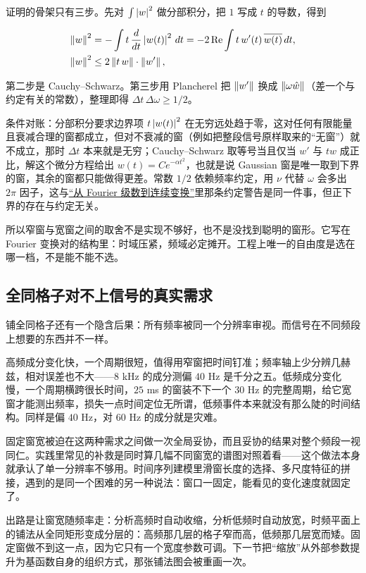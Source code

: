 证明的骨架只有三步。先对 \(\int\left|w\right|^2\) 做分部积分，把 \(1\) 写成 \(t\) 的导数，得到

\[
\begin{aligned}
\left\lVert w\right\rVert^2&=-\int t\,\frac{d}{dt}\left|w(t)\right|^2\,dt=-2\operatorname{Re}\int t\,w'(t)\,\overline{w(t)}\,dt,\\
\left\lVert w\right\rVert^2&\le 2\left\lVert t\,w\right\rVert\cdot\left\lVert w'\right\rVert,
\end{aligned}
\]

第二步是 Cauchy--Schwarz。第三步用 Plancherel 把 \(\left\lVert w'\right\rVert\) 换成 \(\left\lVert\omega\hat w\right\rVert\)（差一个与约定有关的常数），整理即得 \(\Delta t\,\Delta\omega\ge1/2\)。

条件对账：分部积分要求边界项 \(t\left|w(t)\right|^2\) 在无穷远处趋于零，这对任何有限能量且衰减合理的窗都成立，但对不衰减的窗（例如把整段信号原样取来的``无窗''）就不成立，那时 \(\Delta t\) 本来就是无穷；Cauchy--Schwarz 取等号当且仅当 \(w'\) 与 \(t w\) 成正比，解这个微分方程给出 \(w(t)=Ce^{-\alpha t^2}\)，也就是说 Gaussian 窗是唯一取到下界的窗，其余的窗都只能做得更差。常数 \(1/2\) 依赖频率约定，用 \(\nu\) 代替 \(\omega\) 会多出 \(2\pi\) 因子，这与\hyperref[sec:08-Numerical-Analysis/08-Fourier-and-Spectral-Methods/01]{``从 Fourier 级数到连续变换''}里那条约定警告是同一件事，但正下界的存在与约定无关。

所以窄窗与宽窗之间的取舍不是实现不够好，也不是没找到聪明的窗形。它写在 Fourier 变换对的结构里：时域压紧，频域必定摊开。工程上唯一的自由度是选在哪一档，不是能不能不选。

\subsection{全同格子对不上信号的真实需求}

铺全同格子还有一个隐含后果：所有频率被同一个分辨率审视。而信号在不同频段上想要的东西并不一样。

高频成分变化快，一个周期很短，值得用窄窗把时间钉准；频率轴上少分辨几赫兹，相对误差也不大——\(8\) kHz 的成分测偏 \(40\) Hz 是千分之五。低频成分变化慢，一个周期横跨很长时间，\(25\) ms 的窗装不下一个 \(30\) Hz 的完整周期，给它宽窗才能测出频率，损失一点时间定位无所谓，低频事件本来就没有那么陡的时间结构。同样是偏 \(40\) Hz，对 \(60\) Hz 的成分就是灾难。

固定窗宽被迫在这两种需求之间做一次全局妥协，而且妥协的结果对整个频段一视同仁。实践里常见的补救是同时算几幅不同窗宽的谱图对照着看——这个做法本身就承认了单一分辨率不够用。时间序列建模里滑窗长度的选择、多尺度特征的拼接，遇到的是同一个困难的另一种说法：窗口一固定，能看见的变化速度就固定了。

出路是让窗宽随频率走：分析高频时自动收缩，分析低频时自动放宽，时频平面上的铺法从全同矩形变成分层的：高频那几层的格子窄而高，低频那几层宽而矮。固定窗做不到这一点，因为它只有一个宽度参数可调。下一节把``缩放''从外部参数提升为基函数自身的组织方式，那张铺法图会被重画一次。
